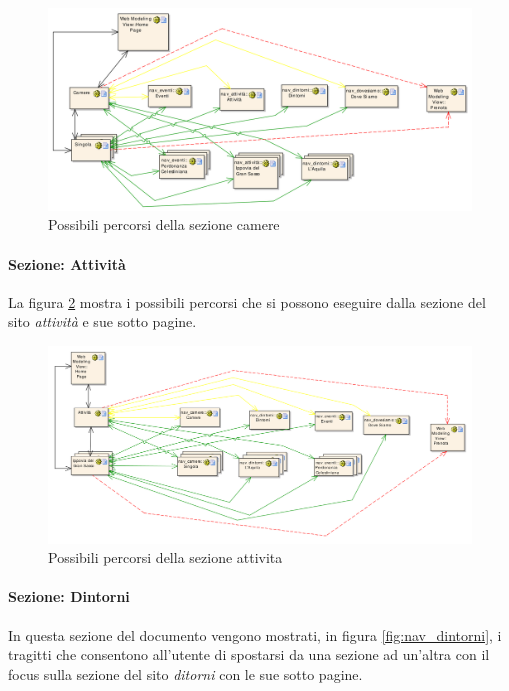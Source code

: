 \documentclass[a4paper,12pt,hidelinks]{report}
\begin{document}
\begin{figure}[h!]%
    \includegraphics[width=1.1\textwidth,keepaspectratio=true]{../../img/nav_camere}
    \centering
    \caption{Possibili percorsi della sezione camere}%
    \label{fig:nav_camere}%
\end{figure}

\newpage
\paragraph{Sezione: Attività}
La figura \ref{fig:nav_attivita} mostra i possibili percorsi che si possono eseguire dalla sezione del sito \textit{attività} e sue sotto pagine.

\begin{figure}[h!]%
    \includegraphics[width=1.1\textwidth,keepaspectratio=true]{../../img/nav_attivita}
    \centering
    \caption{Possibili percorsi della sezione attivita}%
    \label{fig:nav_attivita}%
\end{figure}

\newpage
\paragraph{Sezione: Dintorni}
In questa sezione del documento vengono mostrati, in figura \ref{fig:nav_dintorni}, i tragitti che consentono all'utente di spostarsi da una sezione ad un'altra con il focus 
sulla sezione del sito \textit{ditorni} con le sue sotto pagine.
\end{document}

